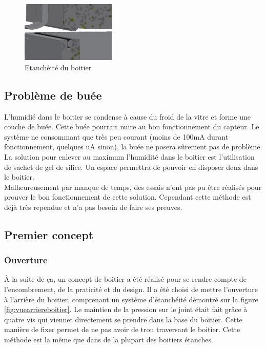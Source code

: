 \begin{figure}[H]
    \centering
    \includegraphics[width=0.4\textwidth]{Images/photos_PGA/EtanchBoitier.PNG}
    \caption{Etanchéité du boitier}
    \label{fig:etanche}
\end{figure}

\subsection{Problème de buée}

L’humidié dans le boitier se condense à cause du froid de la vitre et forme une couche de buée. Cette buée 
pourrait nuire au bon fonctionnement du capteur. Le système ne consommant que très peu courant (moins de 
100mA durant fonctionnement, quelques uA sinon), la buée ne posera sûrement pas de problème. La solution 
pour enlever au maximum l’humidité dans le boitier est l'utilisation de sachet de gel de silice. Un espace permettra 
de pouvoir en disposer deux dans le boitier. \\
Malheureusement par manque de temps, des essais n’ont pas pu être réalisés pour prouver le bon fonctionnement 
de cette solution. Cependant cette méthode est déjà très rependue et n’a pas besoin de faire ses preuves.

\subsection{Premier concept}

\subsubsection{Ouverture}

À la suite de ça, un concept de boitier a été réalisé pour se rendre compte de l’encombrement, de la 
praticité et du design. Il a été choisi de mettre l'ouverture à l’arrière du boitier, comprenant un
système d’étanchéité démontré sur la figure \ref{fig:vuearriereboitier}. Le maintien de la pression 
sur le joint était fait grâce à quatre vis qui viennet directement se prendre dans la base du boitier. 
Cette manière de fixer permet de ne pas avoir de trou traversant le boitier. Cette méthode est la 
même que dans de la plupart des boitiers étanches.

